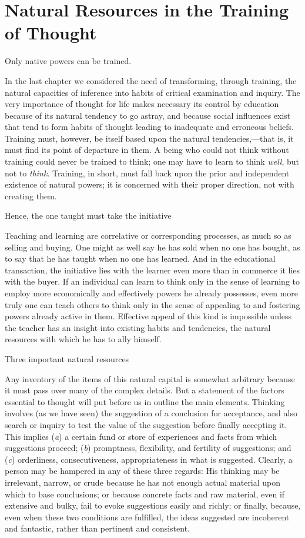 \documentclass[letterpaper]{book}
\begin{document}
\chapter{Natural Resources in the Training of Thought}

Only native powers can be trained.

In the last chapter we considered the need of transforming, through
training, the natural capacities of inference into habits of critical
examination and inquiry. The very importance of thought for life makes
necessary its control by education because of its natural tendency to go
astray, and because social influences exist that tend to form habits of
thought leading to inadequate and erroneous beliefs. Training must,
however, be itself based upon the natural tendencies,---that is, it must
find its point of departure in them. A being who could not think without
training could never be trained to think; one may have to learn to think
\emph{well}, but not to \emph{think}. Training, in short, must fall back
upon the prior and independent existence of natural powers; it is
concerned with their proper direction, not with creating them.

Hence, the one taught must take the initiative

Teaching and learning are correlative or corresponding processes, as
much so as selling and buying. One might as well say he has sold when no
one has bought, as to say that he has taught when no one has learned.
And in the educational transaction, the initiative lies with the learner
even more than in commerce it lies with the buyer. If an individual can
learn to think only in the sense of learning to employ more economically
and
effectively powers he already possesses, even more truly one can teach
others to think only in the sense of appealing to and fostering powers
already active in them. Effective appeal of this kind is impossible
unless the teacher has an insight into existing habits and tendencies,
the natural resources with which he has to ally himself.

Three important natural resources

Any inventory of the items of this natural capital is somewhat arbitrary
because it must pass over many of the complex details. But a statement
of the factors essential to thought will put before us in outline the
main elements. Thinking involves (as we have seen) the suggestion of a
conclusion for acceptance, and also search or inquiry to test the value
of the suggestion before finally accepting it. This implies (\emph{a}) a
certain fund or store of experiences and facts from which suggestions
proceed; (\emph{b}) promptness, flexibility, and fertility of
suggestions; and (\emph{c}) orderliness, consecutiveness,
appropriateness in what is suggested. Clearly, a person may be hampered
in any of these three regards: His thinking may be irrelevant, narrow,
or crude because he has not enough actual material upon which to base
conclusions; or because concrete facts and raw material, even if
extensive and bulky, fail to evoke suggestions easily and richly; or
finally, because, even when these two conditions are fulfilled, the
ideas suggested are incoherent and fantastic, rather than pertinent and
consistent.
\end{document}
